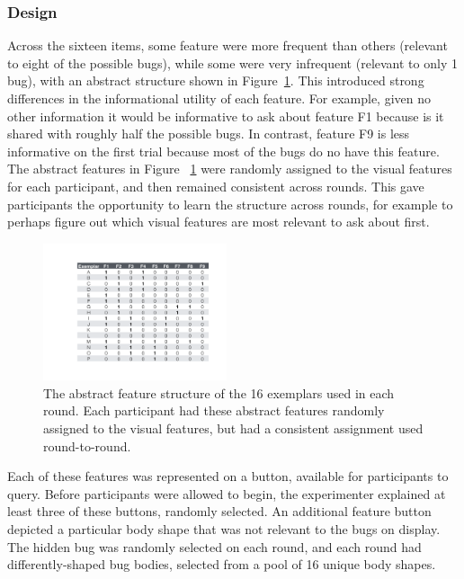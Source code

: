 \documentclass[10pt,letterpaper]{article}
\begin{document}
\subsubsection{Design}

Across the sixteen items, some feature were more frequent than others (relevant to eight of the possible
bugs), while some were very infrequent (relevant to only 1 bug), with an
abstract structure shown in Figure~\ref{fig:feature_table}. This introduced
strong differences in the informational utility of each feature.  For example,
given no other information it would be informative to ask about feature F1
because is it shared with roughly half the possible bugs.  In contrast, feature
F9 is less informative on the first trial because most of the bugs do no have this
feature. The abstract features in Figure~
\ref{fig:feature_table} were randomly assigned to the visual features for each 
participant, and then remained consistent across rounds. This gave participants the 
opportunity to learn the structure across rounds, for example to perhaps figure out 
which visual features are most relevant to ask about first.

\begin{figure}[h]
  \centering
  \includegraphics[width=0.48\textwidth]{figures/feature_table}
  \caption{The abstract feature structure of the 16 exemplars used in each round. 
Each participant had these abstract features randomly assigned to the visual 
features, but had a consistent assignment used round-to-round.}
  \label{fig:feature_table}
\end{figure} 

Each of these features was represented on a button, available for participants to query. Before 
participants were allowed to begin, the experimenter explained at least three of 
these buttons, randomly selected. An additional feature button depicted a particular 
body shape that was not relevant to the bugs on display. The hidden bug was 
randomly selected on each round, and each round had differently-shaped bug 
bodies, selected from a pool of 16 unique body shapes.
\end{document}
